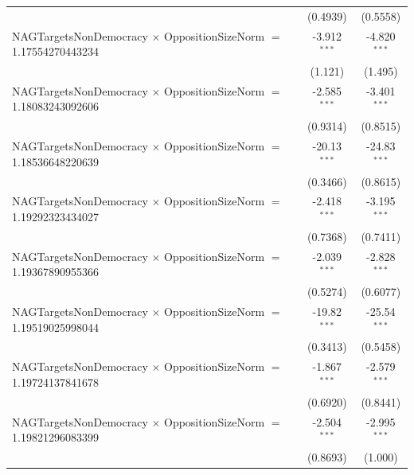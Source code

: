 \begin{tabular}{lcc}
                                                                                & (0.4939)             & (0.5558)\\   
   NAGTargetsNonDemocracy $\times$ OppositionSizeNorm $=$ 1.17554270443234      & -3.912$^{***}$       & -4.820$^{***}$\\   
                                                                                & (1.121)              & (1.495)\\   
   NAGTargetsNonDemocracy $\times$ OppositionSizeNorm $=$ 1.18083243092606      & -2.585$^{***}$       & -3.401$^{***}$\\   
                                                                                & (0.9314)             & (0.8515)\\   
   NAGTargetsNonDemocracy $\times$ OppositionSizeNorm $=$ 1.18536648220639      & -20.13$^{***}$       & -24.83$^{***}$\\   
                                                                                & (0.3466)             & (0.8615)\\   
   NAGTargetsNonDemocracy $\times$ OppositionSizeNorm $=$ 1.19292323434027      & -2.418$^{***}$       & -3.195$^{***}$\\   
                                                                                & (0.7368)             & (0.7411)\\   
   NAGTargetsNonDemocracy $\times$ OppositionSizeNorm $=$ 1.19367890955366      & -2.039$^{***}$       & -2.828$^{***}$\\   
                                                                                & (0.5274)             & (0.6077)\\   
   NAGTargetsNonDemocracy $\times$ OppositionSizeNorm $=$ 1.19519025998044      & -19.82$^{***}$       & -25.54$^{***}$\\   
                                                                                & (0.3413)             & (0.5458)\\   
   NAGTargetsNonDemocracy $\times$ OppositionSizeNorm $=$ 1.19724137841678      & -1.867$^{***}$       & -2.579$^{***}$\\   
                                                                                & (0.6920)             & (0.8441)\\   
   NAGTargetsNonDemocracy $\times$ OppositionSizeNorm $=$ 1.19821296083399      & -2.504$^{***}$       & -2.995$^{***}$\\   
                                                                                & (0.8693)             & (1.000)\\   

\end{tabular}
